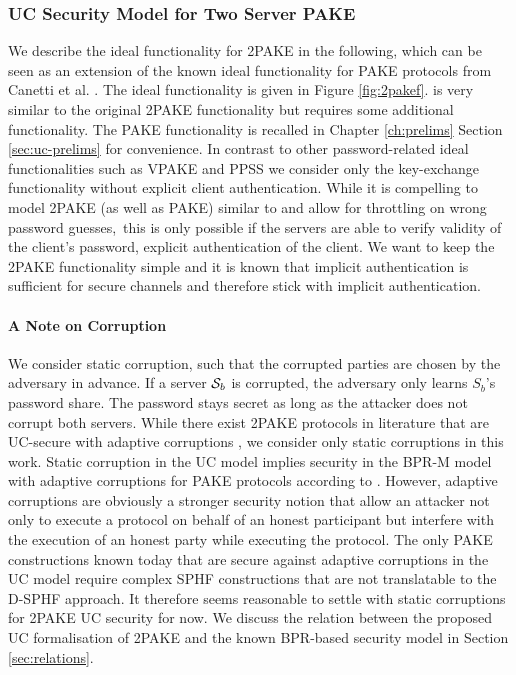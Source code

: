 \subsubsection{UC Security Model for Two Server PAKE}\label{sec:2pakesecurity}
We describe the ideal functionality for \ac{2PAKE} in the following, which can be seen as an extension of the known ideal functionality for \ac{PAKE} protocols from Canetti et al. \cite{Canetti2005}.
The ideal functionality \FTWOPAKE is given in Figure \ref{fig:2pakef}.
\FTWOPAKE is very similar to the original \ac{2PAKE} functionality but requires some additional functionality.
The \ac{PAKE} functionality is recalled in Chapter \ref{ch:prelims} Section \ref{sec:uc-prelims} for convenience.
In contrast to other password-related ideal functionalities such as \ac{VPAKE} \cite{Gentry2006} and \ac{PPSS} \cite{Camenisch2012} we consider only the key-exchange functionality without explicit client authentication.
While it is compelling to model \ac{2PAKE} (as well as \ac{PAKE}) similar to \cite{Camenisch2012} and allow for throttling on wrong password guesses,\footnotemark\ this is only possible if the servers are able to verify validity of the client's password, \ie explicit authentication of the client.
We want to keep the \ac{2PAKE} functionality simple and it is known that implicit authentication is sufficient for secure channels \cite{CanettiK01} and therefore stick with implicit authentication.


\paragraph{A Note on Corruption}
We consider static corruption, such that the corrupted parties are chosen by the adversary in advance.
If a server $\mathcal{S}_b$ is corrupted, the adversary only learns $S_b$'s password share. 
The password stays secret as long as the attacker does not corrupt both servers.
While there exist \ac{2PAKE} protocols in literature that are \ac{UC}-secure with adaptive corruptions \cite{AbdallaBBCP13,AbdallaBP14a,AbdallaCCP09,AbdallaCP09}, we consider only static corruptions in this work.
Static corruption in the \ac{UC} model implies security in the \ac{BPR-M} model with adaptive corruptions for \ac{PAKE} protocols according to \citet{Canetti2005}.
However, adaptive corruptions are obviously a stronger security notion that allow an attacker not only to execute a protocol on behalf of an honest participant but interfere with the execution of an honest party while executing the protocol.
The only \ac{PAKE} constructions known today that are secure against adaptive corruptions in the \ac{UC} model require complex \ac{SPHF} constructions that are not translatable to the \ac{D-SPHF} approach.
It therefore seems reasonable to settle with static corruptions for \ac{2PAKE} \ac{UC} security for now.
We discuss the relation between the proposed \ac{UC} formalisation of \ac{2PAKE} and the known BPR-based security model in Section \ref{sec:relations}.

